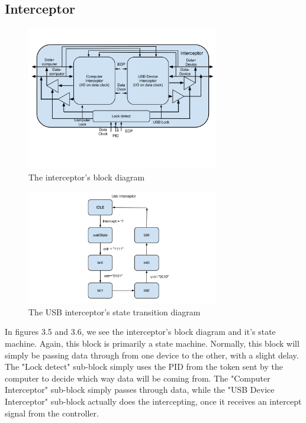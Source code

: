 \documentclass[12pt,letter,oneside]{report}
\begin{document}
\subsection{Interceptor}
\begin{figure}[h!]
	\centering
	\caption{The interceptor's block diagram}
	\includegraphics[width=0.75\textwidth]{interceptorBlock}
\end{figure}
\begin{figure}[h!]
	\centering
	\caption{The USB interceptor's state transition diagram}
	\includegraphics[width=0.75\textwidth]{interceptorTrans}
\end{figure}
In figures 3.5 and 3.6, we see the interceptor's block diagram and it's state machine. Again, this block is primarily a state machine. Normally, this block will simply be passing data through from one device to the other, with a slight delay. The "Lock detect" sub-block simply uses the PID from the token sent by the computer to decide which way data will be coming from. The "Computer Interceptor" sub-block simply passes through data, while the "USB Device Interceptor" sub-block actually does the intercepting, once it receives an intercept signal from the controller.
\pagebreak
\end{document}
